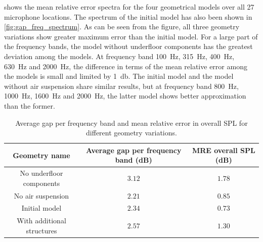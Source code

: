  shows the mean relative error spectra for the four geometrical models over all 27 microphone locations. The spectrum of the initial model has also been shown in \cref{fig:gap_freq_spectrum}. As can be seen from the figure, all three geometry variations show greater maximum error than the initial model. For a large part of the frequency bands, the model without underfloor components has the greatest deviation among the models. At frequency band \SI{100}{\hertz}, \SI{315}{\hertz}, \SI{400}{\hertz}, \SI{630}{\hertz} and \SI{2000}{\hertz}, the difference in terms of the mean relative error among the models is small and limited by \SI{1}{\decibel}. The initial model and the model without air suspension share similar results, but at frequency band \SI{800}{\hertz}, \SI{1000}{\hertz}, \SI{1600}{\hertz} and \SI{2000}{\hertz}, the latter model shows better approximation than the former.

\begin{table}
	\centering
	\caption{Average gap per frequency band and mean relative error in overall SPL for different geometry variations.}
	\label{tab:geometry_variation_MRE}
	\begin{tabular}{ccc}
		\toprule
		Geometry name              & Average gap per frequency band (dB) & MRE overall SPL (dB) \\
		\midrule
		No underfloor components   & $3.12$                       & $1.78$        \\
		No air suspension          & $2.21$                       & $0.85$        \\
		Initial model              & $2.34$                       & $0.73$        \\
		With additional structures & $2.57$                       & $1.30$ \\
		\bottomrule  
	\end{tabular}
\end{table}


